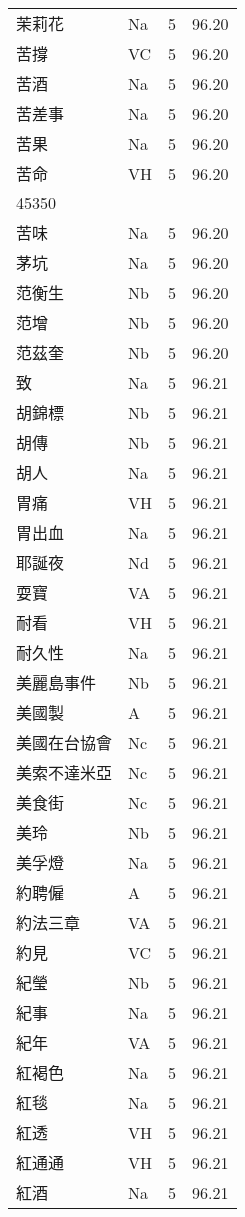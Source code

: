 \documentclass[twocolumn]{book}
\begin{document}
\begin{supertabular}{llrr}
茉莉花 & Na & 5 &  96.20\\
苦撐 & VC & 5 &  96.20\\
苦酒 & Na & 5 &  96.20\\
苦差事 & Na & 5 &  96.20\\
苦果 & Na & 5 &  96.20\\
苦命 & VH & 5 &  96.20\\
45350\\
苦味 & Na & 5 &  96.20\\
茅坑 & Na & 5 &  96.20\\
范衡生 & Nb & 5 &  96.20\\
范增 & Nb & 5 &  96.20\\
范茲奎 & Nb & 5 &  96.20\\
致 & Na & 5 &  96.21\\
胡錦標 & Nb & 5 &  96.21\\
胡傳 & Nb & 5 &  96.21\\
胡人 & Na & 5 &  96.21\\
胃痛 & VH & 5 &  96.21\\
胃出血 & Na & 5 &  96.21\\
耶誕夜 & Nd & 5 &  96.21\\
耍寶 & VA & 5 &  96.21\\
耐看 & VH & 5 &  96.21\\
耐久性 & Na & 5 &  96.21\\
美麗島事件 & Nb & 5 &  96.21\\
美國製 & A & 5 &  96.21\\
美國在台協會 & Nc & 5 &  96.21\\
美索不達米亞 & Nc & 5 &  96.21\\
美食街 & Nc & 5 &  96.21\\
美玲 & Nb & 5 &  96.21\\
美孚燈 & Na & 5 &  96.21\\
約聘僱 & A & 5 &  96.21\\
約法三章 & VA & 5 &  96.21\\
約見 & VC & 5 &  96.21\\
紀瑩 & Nb & 5 &  96.21\\
紀事 & Na & 5 &  96.21\\
紀年 & VA & 5 &  96.21\\
紅褐色 & Na & 5 &  96.21\\
紅毯 & Na & 5 &  96.21\\
紅透 & VH & 5 &  96.21\\
紅通通 & VH & 5 &  96.21\\
紅酒 & Na & 5 &  96.21\\

\end{supertabular}
\end{document}
